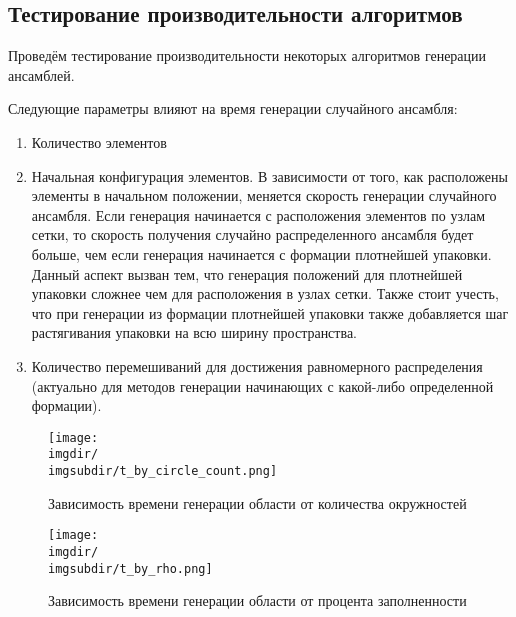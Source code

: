 \subsection{Тестирование производительности алгоритмов\label{tesing}}

Проведём тестирование производительности некоторых алгоритмов генерации ансамблей. 

Следующие параметры влияют на время генерации случайного ансамбля:
\begin{enumerate}
    \item 
        Количество элементов
    \item 
        Начальная конфигурация элементов. В зависимости от того, как расположены элементы в начальном положении, меняется скорость генерации случайного ансамбля. Если генерация начинается с расположения элементов по узлам сетки, то скорость получения случайно распределенного ансамбля будет больше, чем если генерация начинается с формации плотнейшей упаковки. Данный аспект вызван тем, что генерация положений для плотнейшей упаковки сложнее чем для расположения в узлах сетки. Также стоит учесть, что при генерации из формации плотнейшей упаковки также добавляется шаг растягивания упаковки на всю ширину пространства.
    \item 
        Количество перемешиваний для достижения равномерного распределения (актуально для методов генерации начинающих с какой-либо определенной формации).
    
\end{enumerate}

\renewcommand{\imgsubdir}{speed_analysis}
\begin{figure}[h!]
    \centering
    \texttt{[image: \\imgdir/\\imgsubdir/t\_by\_circle\_count.png]}
    \caption{Зависимость времени генерации области от количества окружностей}
    \label{fig:my_label}
\end{figure}

\begin{figure}[h]
    \centering
    \texttt{[image: \\imgdir/\\imgsubdir/t\_by\_rho.png]}
    \caption{Зависимость времени генерации области от процента заполненности}
    \label{fig:my_label}
\end{figure}

